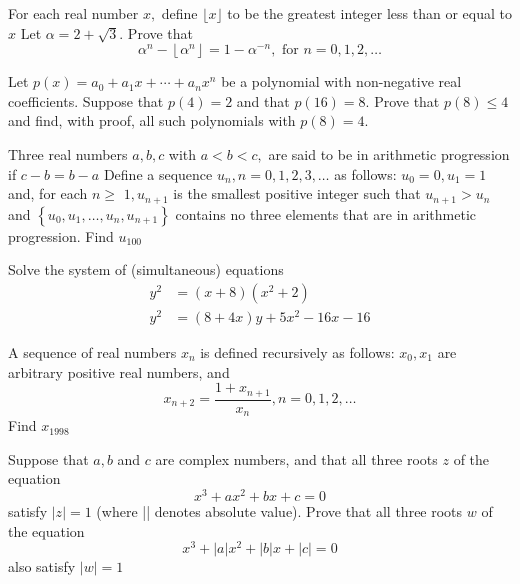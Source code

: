 \documentclass{pset}
\begin{document}
\begin{problems}
\begin{problem}[IrMO 2002 Q9]
    For each real number \(x,\) define \(\lfloor x\rfloor\) to be the greatest integer less than or equal to \(x\)
    Let \(\alpha=2+\sqrt{3} .\) Prove that
    $$
    \alpha^{n}-\left\lfloor\alpha^{n}\right\rfloor= 1-\alpha^{-n}, \text { for } n=0,1,2, \ldots
    $$
\end{problem}

\begin{problem}[IrMO 2000 Q5]
    Let \(p(x)=a_{0}+a_{1} x+\cdots+a_{n} x^{n}\) be a polynomial with non-negative real coefficients. Suppose that \(p(4)=2\) and that \(p(16)=8 .\) Prove that \(p(8) \leq 4\) and find, with proof, all such polynomials with \(p(8)=4\).
\end{problem}

\begin{problem}[IrMO 1999 Q5]
    Three real numbers \(a, b, c\) with \(a<b<c,\) are said to be in arithmetic progression
    if \(c-b=b-a\) Define a sequence \(u_{n}, n=0,1,2,3, \ldots\) as follows: \(u_{0}=0, u_{1}=1\) and, for each \(n \geq\)
    \(1, u_{n+1}\) is the smallest positive integer such that \(u_{n+1}>u_{n}\) and \(\left\{u_{0}, u_{1}, \ldots, u_{n}, u_{n+1}\right\}\) contains no three elements that are in arithmetic progression. Find \(u_{100}\)
\end{problem}

\begin{problem}[IrMO 1999 Q6]
    Solve the system of (simultaneous) equations
    $$
    \begin{aligned}
    y^{2} &=(x+8)\left(x^{2}+2\right) \\
    y^{2} &=(8+4 x) y+5 x^{2}-16 x-16
    \end{aligned}
    $$
\end{problem}

\begin{problem}[IrMO 1998 Q9]
    A sequence of real numbers \(x_{n}\) is defined recursively as follows: \(x_{0}, x_{1}\) are arbitrary positive real numbers, and
    $$
    x_{n+2}=\frac{1+x_{n+1}}{x_{n}}, n=0,1,2, \ldots
    $$
    Find \(x_{1998}\)
\end{problem}

\begin{problem}[IrMO 1995 Q7]
    Suppose that \(a, b\) and \(c\) are complex numbers, and that all three roots \(z\) of the equation
    $$
    x^{3}+a x^{2}+b x+c=0
    $$
    satisfy \(|z|=1\) (where || denotes absolute value). Prove that all three roots \(w\) of the equation
    $$
    x^{3}+|a| x^{2}+|b| x+|c|=0
    $$
    also satisfy \(|w|=1\)
\end{problem}



\end{problems}
\end{document}

